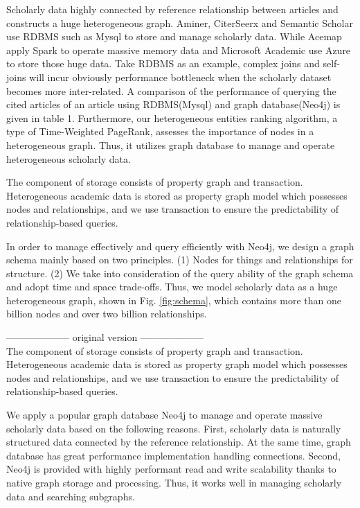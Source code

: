 \par
Scholarly data highly connected by reference relationship between articles and constructs a huge heterogeneous graph. Aminer, CiterSeerx and Semantic Scholar use RDBMS such as Mysql to store and manage scholarly data. While Acemap apply Spark to operate massive memory data and Microsoft Academic use Azure to store those huge data. Take RDBMS as an example, complex joins and self-joins will incur obviously performance bottleneck when the scholarly dataset becomes more inter-related. A comparison of the performance of querying the cited articles of an article using RDBMS(Mysql) and graph database(Neo4j) is given in table 1. Furthermore, our heterogeneous entities ranking algorithm, a type of Time-Weighted PageRank, assesses the importance of nodes in a heterogeneous graph. Thus, it utilizes graph database to manage and operate heterogeneous scholarly data.

\par 
The component of storage consists of property graph and transaction. Heterogeneous academic data is stored as property graph model which possesses nodes and relationships, and we use transaction to ensure the predictability of relationship-based queries.

\par
In order to manage effectively and query efficiently with Neo4j, we design a graph schema mainly based on two principles. (1) Nodes for things and relationships for structure. (2) We take into consideration of the query ability of the graph schema and adopt time and space trade-offs. Thus, we model scholarly data as a huge heterogeneous graph, shown in Fig. \ref{fig:schema}, which contains more than one billion nodes and over two billion relationships.


-------------------- original version --------------------  \\

The component of storage consists of property graph and transaction. Heterogeneous academic data is stored as property graph model which possesses nodes and relationships, and we use transaction to ensure the predictability of relationship-based queries.

We apply a popular graph database Neo4j \cite{Neo4j} to manage and operate massive scholarly data based on the following reasons. First, scholarly data is naturally structured data connected by the reference relationship. At the same time, graph database has great performance implementation handling connections. Second, Neo4j is provided with highly performant read and write scalability thanks to native graph storage and processing. Thus, it works well in managing scholarly data and searching subgraphs.

